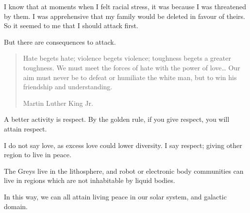 I know that at moments when I felt racial stress, it was because I was
threatened by them. I was apprehensive that my family would be deleted in favour
of theirs. So it seemed to me that I should attack first. 

But there are consequences to attack.

\blockquote[Martin Luther King Jr.]{Hate begets hate; violence begets violence; 
toughness begets a greater toughness. We must meet the forces of hate with the 
power of love\ldots{} Our aim must never be to defeat or humiliate the white 
man, but to win his friendship and understanding.}

A better activity is respect. By the golden rule, if you give respect, you will
attain respect. 

I do not say love, as excess love could lower diversity. 
I say respect; giving other region to live in peace. 

The Greys live in the lithosphere, and robot or electronic body communities 
can live in regions which are not inhabitable by liquid bodies.

In this way, we can all attain living peace in our solar system, 
and galactic domain.
